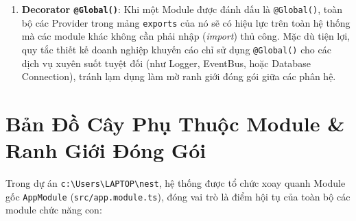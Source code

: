 \documentclass[12pt,a4paper,oneside]{book}
\begin{document}
\begin{enumerate}
\begin{codebox}
\begin{Verbatim}[fontsize=\small]
    secret: configService.get<string>('JWT_SECRET'),
    signOptions: { expiresIn: configService.get<string>('JWT_EXPIRATION') },
  }),
})
\end{Verbatim}
\end{codebox}
  \item \textbf{Decorator \texttt{@Global()}}: Khi một Module được đánh dấu là \texttt{@Global()}, toàn bộ các Provider trong mảng \texttt{exports} của nó sẽ có hiệu lực trên toàn hệ thống mà các module khác không cần phải nhập (\textit{import}) thủ công. Mặc dù tiện lợi, quy tắc thiết kế doanh nghiệp khuyến cáo chỉ sử dụng \texttt{@Global()} cho các dịch vụ xuyên suốt tuyệt đối (như Logger, EventBus, hoặc Database Connection), tránh lạm dụng làm mờ ranh giới đóng gói giữa các phân hệ.
\end{enumerate}

\section{Bản Đồ Cây Phụ Thuộc Module \& Ranh Giới Đóng Gói}
Trong dự án \texttt{c:\textbackslash Users\textbackslash LAPTOP\textbackslash nest}, hệ thống được tổ chức xoay quanh Module gốc \texttt{AppModule} (\texttt{src/app.module.ts}), đóng vai trò là điểm hội tụ của toàn bộ các module chức năng con:
\end{document}
